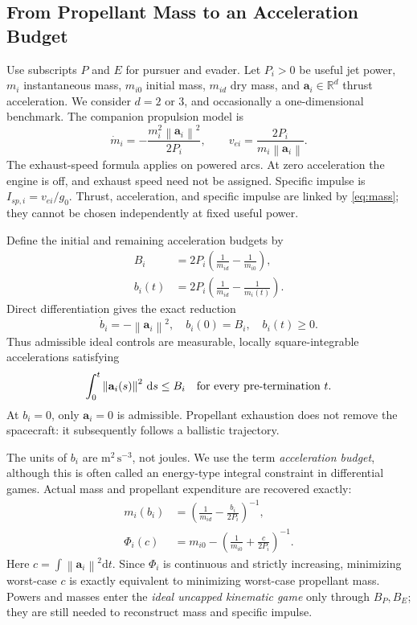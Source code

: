 \documentclass[journal,a4paper]{IEEEtran}
\newcommand{\R}{\mathbb R}
\newcommand{\norm}[1]{\left\|#1\right\|}
\newcommand{\dd}{\mathrm d}
\begin{document}
\subsection{From Propellant Mass to an Acceleration Budget}
Use subscripts $P$ and $E$ for pursuer and evader. Let $P_i>0$ be useful jet power, $m_i$ instantaneous mass, $m_{i0}$ initial mass, $m_{id}$ dry mass, and $\mathbf a_i\in\R^d$ thrust acceleration. We consider $d=2$ or $3$, and occasionally a one-dimensional benchmark. The companion propulsion model is
\begin{equation}
 \dot m_i=-\frac{m_i^2\norm{\mathbf a_i}^2}{2P_i},
 \qquad
 v_{ei}=\frac{2P_i}{m_i\norm{\mathbf a_i}}.
 \label{eq:mass}
\end{equation}
The exhaust-speed formula applies on powered arcs. At zero acceleration the engine is off, and exhaust speed need not be assigned. Specific impulse is $I_{\!sp,i}=v_{ei}/g_0$. Thrust, acceleration, and specific impulse are linked by \eqref{eq:mass}; they cannot be chosen independently at fixed useful power.

Define the initial and remaining acceleration budgets by
\begin{align}
 B_i&=2P_i\left(\frac1{m_{id}}-\frac1{m_{i0}}\right),\label{eq:B}\\
 b_i(t)&=2P_i\left(\frac1{m_{id}}-\frac1{m_i(t)}\right).
 \label{eq:b}
\end{align}
Direct differentiation gives the exact reduction
\begin{equation}
 \boxed{\dot b_i=-\norm{\mathbf a_i}^2,\quad
 b_i(0)=B_i,\quad b_i(t)\ge0.}
 \label{eq:budget}
\end{equation}
Thus admissible ideal controls are measurable, locally square-integrable accelerations satisfying
\begin{equation}
 \int_0^t\norm{\mathbf a_i(s)}^2\,\dd s\le B_i
 \quad\hbox{for every pre-termination }t.
 \label{eq:L2}
\end{equation}
At $b_i=0$, only $\mathbf a_i=0$ is admissible. Propellant exhaustion does not remove the spacecraft: it subsequently follows a ballistic trajectory.

The units of $b_i$ are $\mathrm{m^2\,s^{-3}}$, not joules. We use the term \emph{acceleration budget}, although this is often called an energy-type integral constraint in differential games. Actual mass and propellant expenditure are recovered exactly:
\begin{align}
 m_i(b_i)&=\left(\frac1{m_{id}}-\frac{b_i}{2P_i}\right)^{-1},\label{eq:recovermass}\\
 \Phi_i(c)&=m_{i0}-\left(\frac1{m_{i0}}+\frac{c}{2P_i}\right)^{-1}.
 \label{eq:propellant}
\end{align}
Here $c=\int\norm{\mathbf a_i}^2\dd t$. Since $\Phi_i$ is continuous and strictly increasing, minimizing worst-case $c$ is exactly equivalent to minimizing worst-case propellant mass. Powers and masses enter the \emph{ideal uncapped kinematic game} only through $B_P,B_E$; they are still needed to reconstruct mass and specific impulse.
\end{document}

